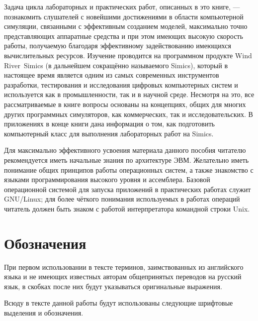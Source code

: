 Задача цикла лабораторных и практических работ, описанных в это книге, --- познакомить слушателей с новейшими достижениями в области компьютерной симуляции, связанными с эффективным созданием моделей, максимально точно представляющих аппаратные средства и при этом имеющих высокую скорость работы, получаемую благодаря эффективному задействованию имеющихся вычислительных ресурсов. Изучение проводится на программном продукте Wind River\textregistered\ Simics (в дальнейшем сокращённо называемого Simics), который в настоящее время является одним из самых современных инструментов разработки, тестирования и исследования цифровых компьютерных систем и используется как в промышленности, так и в научной среде. Несмотря на это, все рассматриваемые в книге вопросы основаны на концепциях, общих для многих других программных симуляторов, как коммерческих, так и исследовательских. В приложениях в конце книги дана информация о том, как подготовить компьютерный класс для выполнения лабораторных работ на Simics.

Для максимально эффективного усвоения материала данного пособия читателю рекомендуется иметь начальные знания по архитектуре ЭВМ. Желательно иметь понимание общих принципов работы операционных систем, а также знакомство с языками программирования высокого уровня и ассемблера. Базовой операционной системой для запуска приложений в практических работах служит GNU/Linux; для более чёткого понимания используемых в работах операций читатель должен быть знаком с работой интерпретатора командной строки Unix.

\section{Обозначения}
При первом использовании в тексте терминов, заимствованных из английского языка и не имеющих известных авторам общепринятых переводов на русский язык, в скобках после них будут указываться оригинальные выражения.

Всюду в тексте данной работы будут использованы следующие шрифтовые выделения и обозначения.

